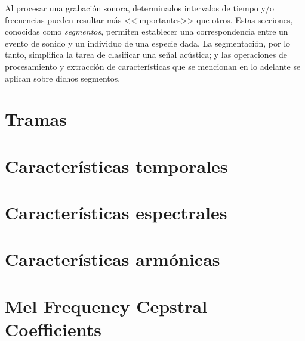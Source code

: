 Al procesar una grabación sonora, determinados intervalos de tiempo y/o frecuencias pueden resultar más <<importantes>> que otros.
Estas secciones, conocidas como \textit{segmentos}, permiten establecer una correspondencia entre un evento de sonido y un individuo de una especie dada.
La segmentación, por lo tanto, simplifica la tarea de clasificar una señal acústica;
y las operaciones de procesamiento y extracción de características que se mencionan en lo adelante se aplican sobre dichos segmentos.

\section{Tramas}\label{sec:frames}


\section{Características temporales}\label{sec:característicasTemporales}


\section{Características espectrales}\label{sec:característicasEspectrales}


\section{Características armónicas}\label{sec:característicasArmónicas}


\section{Mel Frequency Cepstral Coefficients}\label{sec:MFCC}







